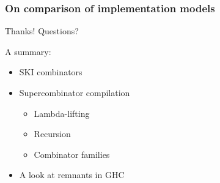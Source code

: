 \documentclass[aspectratio=1610, xcolor={dvipsnames}]{beamer}
\begin{document}
\begin{frame}
    \frametitle{On comparison of implementation models}



\end{frame}

\begin{frame}

    \begin{center}
        \huge Thanks! Questions?
    \end{center}

    \vspace*{2em}

    A summary:
    \begin{itemize}
        \item SKI combinators
        \item Supercombinator compilation
        \begin{itemize}
            \item Lambda-lifting
            \item Recursion
            \item Combinator families
        \end{itemize}
        \item A look at remnants in GHC
    \end{itemize}

\end{frame}

\printbibliography
\end{document}
